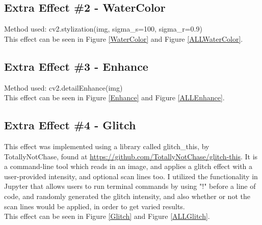 \documentclass[a4paper,10pt]{report}
\begin{document}
	
	\subsection{Extra Effect \#2 - WaterColor}
	Method used: cv2.stylization(img, sigma\_s=100, sigma\_r=0.9)\\
	This effect can be seen in Figure \ref{WaterColor} and Figure \ref{ALLWaterColor}.
	\subsection{Extra Effect \#3 - Enhance}
	Method used: cv2.detailEnhance(img)\\
	This effect can be seen in Figure \ref{Enhance} and Figure \ref{ALLEnhance}.
	\subsection{Extra Effect \#4 - Glitch}
	This effect was implemented using a library called glitch\_this, by TotallyNotChase, found at \url{https://github.com/TotallyNotChase/glitch-this}. It is a command-line tool which reads in an image, and applies a glitch effect with a user-provided intensity, and optional scan lines too. I utilized the functionality in Jupyter that allows users to run terminal commands by using "!" before a line of code, and randomly generated the glitch intensity, and also whether or not the scan lines would be applied, in order to get varied results.\\
	This effect can be seen in Figure \ref{Glitch} and Figure \ref{ALLGlitch}.
	
\end{document}
